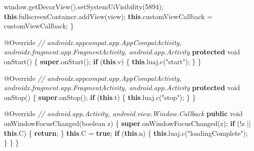 \documentclass[
]{article}
\newenvironment{Shaded}{}{}
\newcommand{\AttributeTok}[1]{\textcolor[rgb]{0.49,0.56,0.16}{#1}}
\newcommand{\CommentTok}[1]{\textcolor[rgb]{0.38,0.63,0.69}{\textit{#1}}}
\newcommand{\ControlFlowTok}[1]{\textcolor[rgb]{0.00,0.44,0.13}{\textbf{#1}}}
\newcommand{\DataTypeTok}[1]{\textcolor[rgb]{0.56,0.13,0.00}{#1}}
\newcommand{\DecValTok}[1]{\textcolor[rgb]{0.25,0.63,0.44}{#1}}
\newcommand{\FunctionTok}[1]{\textcolor[rgb]{0.02,0.16,0.49}{#1}}
\newcommand{\KeywordTok}[1]{\textcolor[rgb]{0.00,0.44,0.13}{\textbf{#1}}}
\newcommand{\NormalTok}[1]{#1}
\newcommand{\OperatorTok}[1]{\textcolor[rgb]{0.40,0.40,0.40}{#1}}
\newcommand{\StringTok}[1]{\textcolor[rgb]{0.25,0.44,0.63}{#1}}
\begin{document}
\begin{Shaded}
\begin{Highlighting}[]
\NormalTok{        window}\OperatorTok{.}\FunctionTok{getDecorView}\OperatorTok{().}\FunctionTok{setSystemUiVisibility}\OperatorTok{(}\DecValTok{5894}\OperatorTok{);}
        \KeywordTok{this}\OperatorTok{.}\FunctionTok{fullscreenContainer}\OperatorTok{.}\FunctionTok{addView}\OperatorTok{(}\NormalTok{view}\OperatorTok{);}
        \KeywordTok{this}\OperatorTok{.}\FunctionTok{customViewCallback} \OperatorTok{=}\NormalTok{ customViewCallback}\OperatorTok{;}
    \OperatorTok{\}}

    \AttributeTok{@Override} \CommentTok{// androidx.appcompat.app.AppCompatActivity, androidx.fragment.app.FragmentActivity, android.app.Activity}
    \KeywordTok{protected} \DataTypeTok{void} \FunctionTok{onStart}\OperatorTok{()} \OperatorTok{\{}
        \KeywordTok{super}\OperatorTok{.}\FunctionTok{onStart}\OperatorTok{();}
        \ControlFlowTok{if} \OperatorTok{(}\KeywordTok{this}\OperatorTok{.}\FunctionTok{v}\OperatorTok{)} \OperatorTok{\{}
            \KeywordTok{this}\OperatorTok{.}\FunctionTok{luaj}\OperatorTok{.}\FunctionTok{c}\OperatorTok{(}\StringTok{"start"}\OperatorTok{);}
        \OperatorTok{\}}
    \OperatorTok{\}}

    \AttributeTok{@Override} \CommentTok{// androidx.appcompat.app.AppCompatActivity, androidx.fragment.app.FragmentActivity, android.app.Activity}
    \KeywordTok{protected} \DataTypeTok{void} \FunctionTok{onStop}\OperatorTok{()} \OperatorTok{\{}
        \KeywordTok{super}\OperatorTok{.}\FunctionTok{onStop}\OperatorTok{();}
        \ControlFlowTok{if} \OperatorTok{(}\KeywordTok{this}\OperatorTok{.}\FunctionTok{t}\OperatorTok{)} \OperatorTok{\{}
            \KeywordTok{this}\OperatorTok{.}\FunctionTok{luaj}\OperatorTok{.}\FunctionTok{c}\OperatorTok{(}\StringTok{"stop"}\OperatorTok{);}
        \OperatorTok{\}}
    \OperatorTok{\}}

    \AttributeTok{@Override} \CommentTok{// android.app.Activity, android.view.Window.Callback}
    \KeywordTok{public} \DataTypeTok{void} \FunctionTok{onWindowFocusChanged}\OperatorTok{(}\DataTypeTok{boolean}\NormalTok{ z}\OperatorTok{)} \OperatorTok{\{}
        \KeywordTok{super}\OperatorTok{.}\FunctionTok{onWindowFocusChanged}\OperatorTok{(}\NormalTok{z}\OperatorTok{);}
        \ControlFlowTok{if} \OperatorTok{(!}\NormalTok{z }\OperatorTok{||} \KeywordTok{this}\OperatorTok{.}\FunctionTok{C}\OperatorTok{)} \OperatorTok{\{}
            \ControlFlowTok{return}\OperatorTok{;}
        \OperatorTok{\}}
        \KeywordTok{this}\OperatorTok{.}\FunctionTok{C} \OperatorTok{=} \KeywordTok{true}\OperatorTok{;}
        \ControlFlowTok{if} \OperatorTok{(}\KeywordTok{this}\OperatorTok{.}\FunctionTok{n}\OperatorTok{)} \OperatorTok{\{}
            \KeywordTok{this}\OperatorTok{.}\FunctionTok{luaj}\OperatorTok{.}\FunctionTok{c}\OperatorTok{(}\StringTok{"loadingComplete"}\OperatorTok{);}
        \OperatorTok{\}}
    \OperatorTok{\}}
\OperatorTok{\}}
\end{Highlighting}
\end{Shaded}
\end{document}
